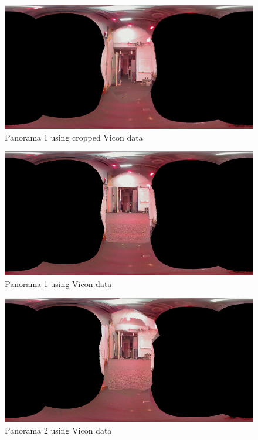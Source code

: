 \documentclass[a4paper]{article}
\begin{document}



\begin{figure}[h]
  \centering
    \includegraphics[width=1\textwidth]{PANORAMA1_small.png}
  \caption{Panorama 1 using cropped Vicon data\label{fig:panorama1}}
\end{figure}

\begin{figure}[h]
  \centering
    \includegraphics[width=1\textwidth]{PANORAMA1_nocrop_small.png}
  \caption{Panorama 1 using Vicon data\label{fig:panorama1_nocrop}}
\end{figure}

\begin{figure}[h]
  \centering
    \includegraphics[width=1\textwidth]{PANORAMA2_nocrop_small.png}
  \caption{Panorama 2 using Vicon data\label{fig:panorama2_nocrop}}
\end{figure}
\end{document}
